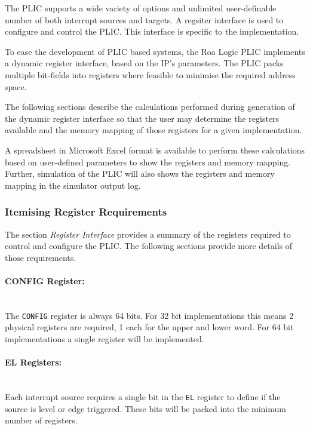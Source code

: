 The PLIC supports a wide variety of options and unlimited user-definable number of both interrupt sources and targets. A regsiter interface is used to configure and control the PLIC. This interface is specific to the implementation.

To ease the development of PLIC based systems, the Roa Logic PLIC implements a dynamic register interface, based on the IP's parameters.
The PLIC packs multiple bit-fields into registers where feasible to minimise the required address space.

The following sections describe the calculations performed during generation of the dynamic register interface so that the user may
determine the registers available and the memory mapping of those registers for a given implementation.

A spreadsheet in Microsoft Excel format is available to perform these calculations based on user-defined parameters to show the registers and memory mapping. Further, simulation of the PLIC will also shows the registers and memory mapping in the simulator output log.

\subsubsection{Itemising Register Requirements}

The section \emph{Register Interface} provides a summary of the registers required to control and configure the PLIC.
The following sections provide more details of those requirements.

\paragraph{CONFIG Register:} ~\\

The \texttt{CONFIG} register is always 64 bits.
For 32 bit implementations this means 2 physical registers are required, 1 each for the upper and lower word.
For 64 bit implementations a single register will be implemented.

\paragraph{EL Registers:} ~\\

Each interrupt source requires a single bit in the \texttt{EL} register to define if the source is level or edge triggered.
These bits will be packed into the minimum number of registers.

